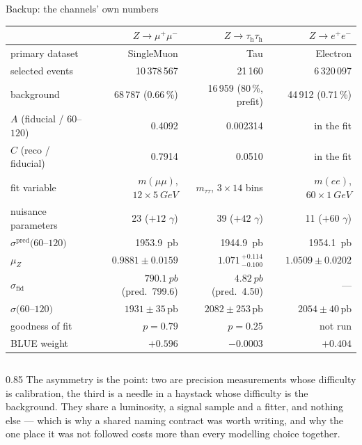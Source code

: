 \documentclass[aspectratio=169,9pt,t]{beamer}
\newcommand{\tauh}{\ensuremath{\tau_{\mathrm{h}}}}
\newcommand{\muZ}{\ensuremath{\mu_{Z}}}
\newcommand{\pb}{\ensuremath{\,\mathrm{pb}}}
\begin{document}
\begin{frame}[noframenumbering]{Backup: the channels' own numbers}
\centering\small
\begin{tabular}{@{}lrrr@{}}
\toprule
 & \textcolor{mumu}{$Z\to\mu^{+}\mu^{-}$} & \textcolor{tautau}{$Z\to\tauh\tauh$} & \textcolor{ee}{$Z\to e^{+}e^{-}$} \\ \midrule
primary dataset & SingleMuon & Tau & Electron \\
selected events & 10\,378\,567 & 21\,160 & 6\,320\,097 \\
background & 68\,787 (0.66\,\%) & 16\,959 (80\,\%, prefit) & 44\,912 (0.71\,\%) \\
$A$ (fiducial / $60$--$120$) & 0.4092 & 0.002314 & in the fit \\
$C$ (reco / fiducial) & 0.7914 & 0.0510 & in the fit \\
fit variable & $m(\mu\mu)$, $12\times\SI{5}{GeV}$ & $m_{\tau\tau}$, $3\times14$ bins & $m(ee)$, $60\times\SI{1}{GeV}$ \\
nuisance parameters & 23 ($+12$ $\gamma$) & 39 ($+42$ $\gamma$) & 11 ($+60$ $\gamma$) \\
$\sigma^{\text{pred}}(60$--$120)$ & \SI{1953.9}{pb} & \SI{1944.9}{pb} & \SI{1954.1}{pb} \\
\muZ & $0.9881 \pm 0.0159$ & $1.071\,^{+0.114}_{-0.100}$ & $1.0509 \pm 0.0202$ \\
$\sigma_{\text{fid}}$ & $\SI{790.1}{pb}$ (pred.\ 799.6) & $\SI{4.82}{pb}$ (pred.\ 4.50) & --- \\
$\sigma(60$--$120)$ & $1931 \pm 35\pb$ & $2082 \pm 253\pb$ & $2054 \pm 40\pb$ \\
goodness of fit & $p = 0.79$ & $p = 0.25$ & \alert{not run} \\
BLUE weight & $+0.596$ & $-0.0003$ & $+0.404$ \\
\bottomrule
\end{tabular}

\vspace{2mm}
\begin{columns}
\begin{column}{0.85\textwidth}\scriptsize
The asymmetry is the point: two are precision measurements whose difficulty is calibration, the
third is a needle in a haystack whose difficulty is the background. They share a luminosity, a
signal sample and a fitter, and nothing else --- which is why a shared naming contract was worth
writing, and why the one place it was not followed costs more than every modelling choice together.
\end{column}
\end{columns}
\end{frame}
\end{document}
